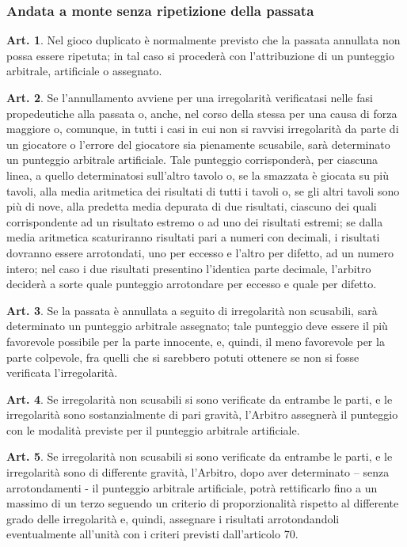 \documentclass[italian,a4paper]{article}
\theoremstyle{definition}
\newtheorem{art}{Art.}
\begin{document}
\subsubsection{Andata a monte senza ripetizione della passata}
\begin{art}
    Nel gioco duplicato è normalmente previsto che la passata annullata non possa essere ripetuta; in tal caso si procederà con l'attribuzione di un punteggio arbitrale, artificiale o assegnato.
\end{art}
\begin{art}
    Se l'annullamento avviene per una irregolarità verificatasi nelle fasi propedeutiche alla passata o, anche, nel corso della stessa per una causa di forza maggiore o, comunque, in tutti i casi in cui non si ravvisi irregolarità da parte di un giocatore o l'errore del giocatore sia pienamente scusabile,  sarà determinato un punteggio arbitrale artificiale.
    Tale punteggio corrisponderà, per ciascuna linea, a quello determinatosi sull'altro tavolo o, se la smazzata è giocata su più tavoli, alla media aritmetica dei risultati di tutti i tavoli o, se gli altri tavoli sono più di nove, alla predetta media depurata di due risultati, ciascuno dei quali corrispondente ad un risultato estremo o ad uno dei risultati estremi; se dalla media aritmetica scaturiranno risultati pari a numeri con decimali, i risultati dovranno essere arrotondati, uno per eccesso e l'altro per difetto, ad un numero intero; nel caso i due risultati presentino l'identica parte decimale, l'arbitro deciderà a sorte quale punteggio arrotondare per eccesso e quale per difetto.
\end{art}
\begin{art}
    Se la passata è annullata a seguito di irregolarità non scusabili, sarà determinato un punteggio arbitrale assegnato; tale punteggio deve essere il più favorevole possibile per la parte innocente, e, quindi, il meno favorevole per la parte colpevole, fra quelli che si sarebbero potuti ottenere se non si fosse verificata l'irregolarità.
\end{art}
\begin{art}
    Se irregolarità non scusabili si sono verificate da entrambe le parti, e le irregolarità sono sostanzialmente di pari gravità, l'Arbitro assegnerà il punteggio con le modalità previste per il punteggio arbitrale artificiale.
\end{art}
\begin{art}
    Se irregolarità non scusabili si sono verificate da entrambe le parti, e le irregolarità sono di differente gravità, l'Arbitro, dopo aver determinato – senza arrotondamenti - il punteggio arbitrale artificiale, potrà rettificarlo fino a un massimo di un terzo seguendo un criterio di proporzionalità rispetto al differente grado delle irregolarità e, quindi, assegnare i risultati arrotondandoli eventualmente all'unità con i criteri previsti dall'articolo 70.
\end{art}
\end{document}
